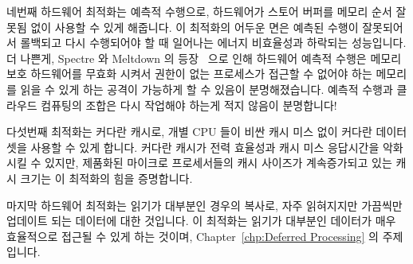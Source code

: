 네번째 하드웨어 최적화는 예측적 수행으로, 하드웨어가 스토어 버퍼를 메모리 순서
잘못됨 없이 사용할 수 있게 해줍니다.
이 최적화의 어두운 면은 예측된 수행이 잘못되어서 롤백되고 다시 수행되어야 할 때
일어나는 에너지 비효율성과 하락되는 성능입니다.
더 나쁜게, Spectre 와 Meltdown 의 등장~\cite{JannHorn2018MeltdownSpectre} 으로
인해 하드웨어 예측적 수행은 메모리 보호 하드웨어를 무효화 시켜서 권한이 없는
프로세스가 접근할 수 없어야 하는 메모리를 읽을 수 있게 하는 공격이 가능하게 할
수 있음이 분명해졌습니다.
예측적 수행과 클라우드 컴퓨팅의 조합은 다시 작업해야 하는게 적지 않음이
분명합니다!

다섯번째 최적화는 커다란 캐시로, 개별 CPU 들이 비싼 캐시 미스 없이 커다란
데이터셋을 사용할 수 있게 합니다.
커다란 캐시가 전력 효율성과 캐시 미스 응답시간을 악화시킬 수 있지만, 제품화된
마이크로 프로세서들의 캐시 사이즈가 계속증가되고 있는 캐시 크기는 이 최적화의
힘을 증명합니다.

마지막 하드웨어 최적화는 읽기가 대부분인 경우의 복사로, 자주 읽혀지지만
가끔씩만 업데이트 되는 데이터에 대한 것입니다.
이 최적화는 읽기가 대부분인 데이터가 매우 효율적으로 접근될 수 있게 하는
것이며,
Chapter~\ref{chp:Deferred Processing} 의 주제입니다.

